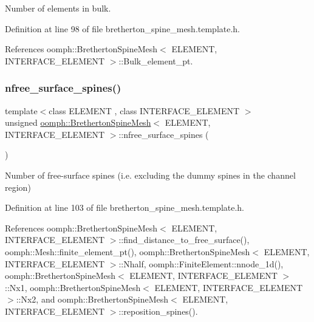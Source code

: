 Number of elements in bulk. 



Definition at line 98 of file bretherton\+\_\+spine\+\_\+mesh.\+template.\+h.



References oomph\+::\+Bretherton\+Spine\+Mesh$<$ E\+L\+E\+M\+E\+N\+T, I\+N\+T\+E\+R\+F\+A\+C\+E\+\_\+\+E\+L\+E\+M\+E\+N\+T $>$\+::\+Bulk\+\_\+element\+\_\+pt.

\mbox{\label{classoomph_1_1BrethertonSpineMesh_ade4d0f2933beddda517b949d80928a18}} 
\subsubsection{\texorpdfstring{nfree\+\_\+surface\+\_\+spines()}{nfree\_surface\_spines()}}
{\footnotesize\ttfamily template$<$class E\+L\+E\+M\+E\+NT , class I\+N\+T\+E\+R\+F\+A\+C\+E\+\_\+\+E\+L\+E\+M\+E\+NT $>$ \\
unsigned \hyperlink{classoomph_1_1BrethertonSpineMesh}{oomph\+::\+Bretherton\+Spine\+Mesh}$<$ E\+L\+E\+M\+E\+NT, I\+N\+T\+E\+R\+F\+A\+C\+E\+\_\+\+E\+L\+E\+M\+E\+NT $>$\+::nfree\+\_\+surface\+\_\+spines (\begin{DoxyParamCaption}{ }\end{DoxyParamCaption})\hspace{0.3cm}{\ttfamily [inline]}}

Number of free-\/surface spines (i.\+e. excluding the dummy spines in the channel region) 

Definition at line 103 of file bretherton\+\_\+spine\+\_\+mesh.\+template.\+h.



References oomph\+::\+Bretherton\+Spine\+Mesh$<$ E\+L\+E\+M\+E\+N\+T, I\+N\+T\+E\+R\+F\+A\+C\+E\+\_\+\+E\+L\+E\+M\+E\+N\+T $>$\+::find\+\_\+distance\+\_\+to\+\_\+free\+\_\+surface(), oomph\+::\+Mesh\+::finite\+\_\+element\+\_\+pt(), oomph\+::\+Bretherton\+Spine\+Mesh$<$ E\+L\+E\+M\+E\+N\+T, I\+N\+T\+E\+R\+F\+A\+C\+E\+\_\+\+E\+L\+E\+M\+E\+N\+T $>$\+::\+Nhalf, oomph\+::\+Finite\+Element\+::nnode\+\_\+1d(), oomph\+::\+Bretherton\+Spine\+Mesh$<$ E\+L\+E\+M\+E\+N\+T, I\+N\+T\+E\+R\+F\+A\+C\+E\+\_\+\+E\+L\+E\+M\+E\+N\+T $>$\+::\+Nx1, oomph\+::\+Bretherton\+Spine\+Mesh$<$ E\+L\+E\+M\+E\+N\+T, I\+N\+T\+E\+R\+F\+A\+C\+E\+\_\+\+E\+L\+E\+M\+E\+N\+T $>$\+::\+Nx2, and oomph\+::\+Bretherton\+Spine\+Mesh$<$ E\+L\+E\+M\+E\+N\+T, I\+N\+T\+E\+R\+F\+A\+C\+E\+\_\+\+E\+L\+E\+M\+E\+N\+T $>$\+::reposition\+\_\+spines().

